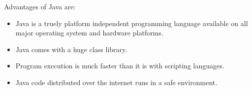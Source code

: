 Advantages of Java are:

\begin{itemize}
	\item Java is a truely platform independent programming language available on all major operating system and hardware platforms.
	\item Java comes with a huge class library.
	\item Program execution is much faster than it is with scripting languages.
	\item Java code distributed over the internet runs in a safe environment.
\end{itemize}